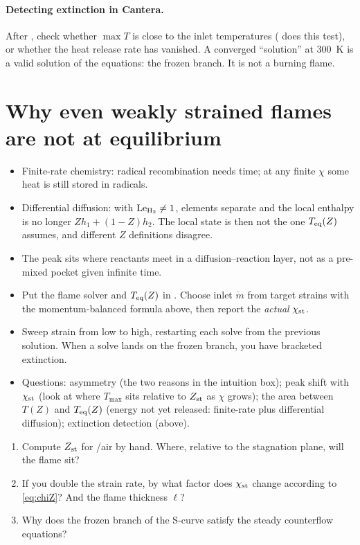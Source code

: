 \paragraph{Detecting extinction in Cantera.} After , check whether
$\max T$ is close to the inlet temperatures ( does this test), or whether the
heat release rate has vanished. A converged ``solution'' at \SI{300}{\kelvin} is a valid solution of the
equations: the frozen branch. It is not a burning flame.

\section{Why even weakly strained flames are not at equilibrium}
\begin{itemize}
  \item Finite-rate chemistry: radical recombination needs time; at any finite $\chi$ some heat is
        still stored in radicals.
  \item Differential diffusion: with $\mathrm{Le}_{\mathrm{H_2}}\ne1$, elements separate and the local
        enthalpy is no longer $Zh_1+(1-Z)h_2$. The local state is then not the one $T_{\rm eq}(Z)$
        assumes, and different $Z$ definitions disagree.
  \item The peak sits where reactants meet in a diffusion--reaction layer, not as a pre-mixed pocket
        given infinite time.
\end{itemize}

\begin{project}[Part 2]
\begin{itemize}
  \item Put the flame solver and $T_{\rm eq}(Z)$ in . Choose inlet $\dot m$ from target strains
        with the momentum-balanced formula above, then report the \emph{actual} $\chi_{\mathrm{st}}$.
  \item Sweep strain from low to high, restarting each solve from the previous solution. When a solve
        lands on the frozen branch, you have bracketed extinction.
  \item Questions: asymmetry (the two reasons in the intuition box); peak shift with $\chi_{\mathrm{st}}$ (look at
        where $T_{\max}$ sits relative to $Z_{\mathrm{st}}$ as $\chi$ grows); the area between $T(Z)$ and $T_{\rm eq}(Z)$
        (energy not yet released: finite-rate plus differential diffusion); extinction detection (above).
\end{itemize}
\end{project}

\begin{selfcheck}
\begin{enumerate}
  \item Compute $Z_{\mathrm{st}}$ for /air by hand. Where, relative to the stagnation plane, will the flame sit?
  \item If you double the strain rate, by what factor does $\chi_{\mathrm{st}}$ change according to \eqref{eq:chiZ}?
        And the flame thickness $\ell$?
  \item Why does the frozen branch of the S-curve satisfy the steady counterflow equations?
\end{enumerate}
\end{selfcheck}
